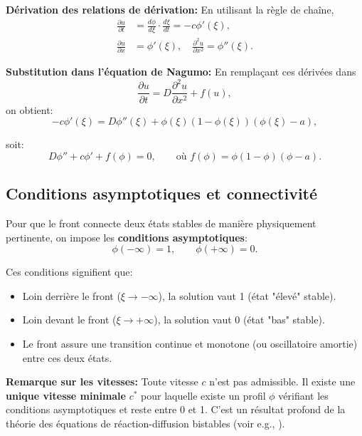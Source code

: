 \documentclass[11pt,a4paper]{report}
\begin{document}
\textbf{Dérivation des relations de dérivation:}
En utilisant la règle de chaîne,
\begin{align}
 \frac{\partial u}{\partial t} &= \frac{d\phi}{d\xi} \cdot \frac{d\xi}{dt} = -c \phi'(\xi), \\
 \frac{\partial u}{\partial x} &= \phi'(\xi), \quad \frac{\partial^2 u}{\partial x^2} = \phi''(\xi).
\end{align}

\textbf{Substitution dans l'équation de Nagumo:}
En remplaçant ces dérivées dans
\begin{equation}
 \frac{\partial u}{\partial t} = D \frac{\partial^2 u}{\partial x^2} + f(u),
\end{equation}
on obtient:
\begin{equation}
 -c\phi'(\xi) = D\phi''(\xi) + \phi(\xi)(1-\phi(\xi))(\phi(\xi)-a),
\end{equation}

soit:
\begin{equation}\boxed{
 D\phi'' + c\phi' + f(\phi) = 0, \qquad \text{où } f(\phi)=\phi(1-\phi)(\phi-a).
}
\end{equation}

\subsection*{Conditions asymptotiques et connectivité}
Pour que le front connecte deux états stables de manière physiquement pertinente,
on impose les \textbf{conditions asymptotiques}:
\begin{equation}
 \phi(-\infty) = 1, \qquad \phi(+\infty) = 0.
\end{equation}

Ces conditions signifient que:
\begin{itemize}[leftmargin=1.5em]
  \item Loin derrière le front ($\xi \to -\infty$), la solution vaut 1 (état "élevé" stable).
  \item Loin devant le front ($\xi \to +\infty$), la solution vaut 0 (état "bas" stable).
  \item Le front assure une transition continue et monotone (ou oscillatoire amortie) entre ces deux états.
\end{itemize}

\textbf{Remarque sur les vitesses:} Toute vitesse $c$ n'est pas admissible. 
Il existe une \textbf{unique vitesse minimale} $c^*$ pour laquelle existe un profil $\phi$ vérifiant
les conditions asymptotiques et reste entre 0 et 1. C'est un résultat profond de la théorie
des équations de réaction-diffusion bistables (voir e.g., \cite{FifeMcLeod1977}).
\end{document}
